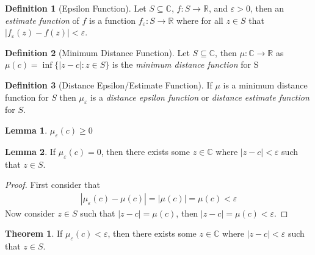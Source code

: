 \documentclass[12pt]{article}
\theoremstyle{definition}
\newtheorem{definition}{Definition}
\theoremstyle{definition}
\newtheorem{theorem}{Theorem}
\theoremstyle{definition}
\newtheorem{lemma}{Lemma}
\theoremstyle{definition}
\begin{document}
\begin{flushleft}


    
\begin{definition}[Epsilon Function]
    Let $S \subseteq \mathbb{C}$, $f\colon S\to\mathbb{R}$, and $\varepsilon > 0$, then an \textit{estimate function} of $f$ is a function $f_\varepsilon\colon S\to\mathbb{R}$ where for all $z \in S$ that $\left|f_\varepsilon(z) - f(z)\right| < \varepsilon$.
\end{definition}

\begin{definition}[Minimum Distance Function]
    Let $S \subseteq \mathbb{C}$, then $\mu\colon\mathbb{C}\to\mathbb{R}$ as $\mu(c) = \inf\{ |z - c| : z \in S \}$ is the \textit{minimum distance function} for S
\end{definition}

\begin{definition}[Distance Epsilon/Estimate Function]
    If $\mu$ is a minimum distance function for $S$ then $\mu_\varepsilon$ is a \textit{distance epsilon function} or \textit{distance estimate function} for $S$.
\end{definition}

\begin{lemma}
    $\mu_\varepsilon(c) \geq 0$
\end{lemma}

\begin{lemma}
    If $\mu_\varepsilon(c) = 0$, then there exists some $z \in \mathbb{C}$ where $|z - c| < \varepsilon$ such that $z \in S$.
\end{lemma}
\begin{proof}
    First consider that
    \begin{align*}
        |\mu_\varepsilon(c) - \mu(c)| = |\mu(c)| = \mu(c) < \varepsilon
    \end{align*}
    Now consider $z \in S$ such that $|z - c| = \mu(c)$, then $|z - c| = \mu(c) < \varepsilon$.
\end{proof}

\begin{theorem}
    If $\mu_\varepsilon(c) < \varepsilon$, then there exists some $z \in \mathbb{C}$ where $|z - c| < \varepsilon$ such that $z \in S$.
\end{theorem}


\end{flushleft}
\end{document}
